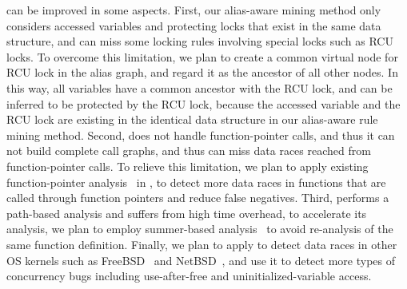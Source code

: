  \sys can be improved in some aspects. First, 
our alias-aware mining method only considers accessed variables and protecting 
locks that exist in the same data structure, and can miss some locking rules 
involving special locks such as RCU locks. To overcome this limitation, we plan 
to create a common virtual node for RCU lock in the alias graph, and regard it 
as the ancestor of all other nodes. In this way, all variables have a common 
ancestor with the RCU lock, and can be inferred to be protected by the RCU 
lock, because the accessed variable and the RCU lock are existing in the 
identical data structure in our alias-aware rule mining method. Second, \sys 
does not handle function-pointer calls, and thus it can not build complete call 
graphs, and thus can miss data races reached from function-pointer calls. To 
relieve this limitation, we plan to apply existing function-pointer 
analysis~\cite{Hind:TOPLAS99, Zhang:ISPEC15, Heintze:PLDI01} in \sys, to detect 
more data races in functions that are called through function pointers and 
reduce false negatives. Third, \sys performs a path-based analysis and suffers 
from high time overhead, to accelerate its analysis, we plan to employ 
summer-based analysis~\cite{Bai:ATC19, Bai:ATC22} to avoid re-analysis of the 
same function definition. Finally, we plan to apply \sys to detect data races 
in other OS kernels such as FreeBSD~\cite{FreeBSD} and NetBSD~\cite{NetBSD}, 
and use it to detect more types of concurrency bugs including use-after-free 
and uninitialized-variable access.